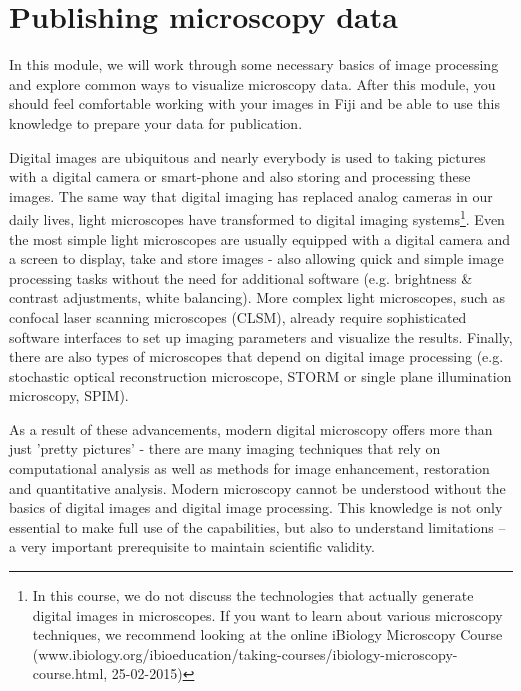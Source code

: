 \chapter{Publishing microscopy data}

In this module, we will work through some necessary basics of image processing and explore common ways to visualize microscopy data. After this module, you should feel comfortable working with your images in Fiji and be able to use this knowledge to prepare your data for publication.

Digital images are ubiquitous and nearly everybody is used to taking pictures with a digital camera or smart-phone and also storing and processing these images. The same way that digital imaging has replaced analog cameras in our daily lives, light microscopes have transformed to digital imaging systems\footnote{In this course, we do not discuss the technologies that actually generate digital images in microscopes. If you want to learn about various microscopy techniques, we recommend looking at the online iBiology Microscopy Course (www.ibiology.org/ibioeducation/taking-courses/ibiology-microscopy-course.html, 25-02-2015)}. Even the most simple light microscopes are usually equipped with a digital camera and a screen to display, take and store images - also allowing quick and simple image processing tasks without the need for additional software (e.g. brightness \& contrast adjustments, white balancing). More complex light microscopes, such as confocal laser scanning microscopes (CLSM), already require sophisticated software interfaces to set up imaging parameters and visualize the results. Finally, there are also types of microscopes that depend on digital image processing (e.g. stochastic optical reconstruction microscope, STORM or single plane illumination microscopy, SPIM).

As a result of these advancements, modern digital microscopy offers
more than just 'pretty pictures' - there are many imaging techniques
that rely on computational analysis as well as methods for image
enhancement, restoration and quantitative analysis. Modern microscopy
cannot be understood without the basics of digital images and digital
image processing. This knowledge is not only essential to make full
use of the capabilities, but also to understand limitations -- a very important prerequisite to maintain scientific validity.

